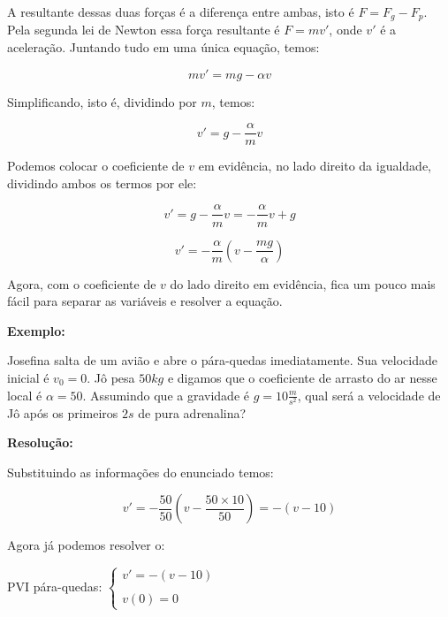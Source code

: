 \documentclass[a4paper]{article}
\begin{document}
A resultante dessas duas forças é a diferença entre ambas, isto é
$F=F_g-F_p$. Pela segunda lei de Newton essa força resultante é
$F=m v'$, onde $v'$ é a aceleração. Juntando tudo em uma única
equação, temos:

\begin{displaymath}
  m v' = mg - \alpha v
\end{displaymath}

Simplificando, isto é, dividindo por $m$, temos:

\begin{displaymath}
  v' = g - \frac{\alpha}{m} v
\end{displaymath}

Podemos colocar o coeficiente de $v$ em evidência, no lado direito da
igualdade, dividindo ambos os termos por ele:

\begin{displaymath}
  v' = g - \frac{\alpha}{m} v = - \frac{\alpha}{m} v +g
\end{displaymath}

\begin{displaymath}
  v' =  -\frac{\alpha}{m} ( v - \frac{mg}{\alpha})
\end{displaymath}

Agora, com o coeficiente de $v$ do lado direito em evidência, fica um
pouco mais fácil para separar as variáveis e resolver a equação.

{\bf Exemplo:}

Josefina salta de um avião e abre o pára-quedas imediatamente. Sua
velocidade inicial é $v_0=0$. Jô pesa $50kg$ e digamos que o
coeficiente de arrasto do ar nesse local é $\alpha = 50$. Assumindo
que a gravidade é $g=10\frac{m}{s^2}$, qual será a velocidade de Jô
após os primeiros $2s$ de pura adrenalina?

{\bf Resolução:}

Substituindo as informações do enunciado temos:

\begin{displaymath}
  v' =  -\frac{50}{50} ( v - \frac{50 \times 10}{50}) = - (v - 10)
\end{displaymath}

Agora já podemos resolver o:

PVI pára-quedas: $\left\{
    \begin{array}{l}
      v' = - (v - 10)
      \\
      \\
      v(0)=0
    \end{array}
  \right.$
\end{document}
